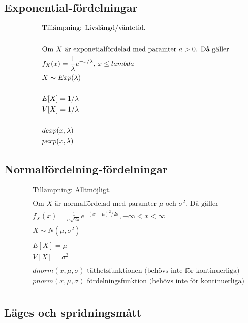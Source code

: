 \subsection{Exponential-fördelningar}
\begin{align*}
  &\quad  \text{Tillämpning: Livslängd/väntetid.} \\
  &\quad  \\
  &\quad  \text{Om $X$ är exponetialfördelad med paramter $ a > 0 $. Då gäller} \\
  &\quad  f_X(x) = \frac{1}{\lambda} e^{-x/\lambda}, \, x\leq{lambda} \\
  &\quad  X \sim Exp(\lambda) \\
  &\quad  \\
  &\quad  E[X]= 1/\lambda \\
  &\quad  V[X]= 1/\lambda \\
  &\quad  \\
  &\quad  dexp(x, \lambda) \\
  &\quad  pexp(x, \lambda) \\
\end{align*}

\subsection{Normalfördelning-fördelningar}
\begin{align*}
  &\quad  \text{Tillämpning: Alltmöjligt.} \\
  &\quad  \\
  &\quad  \text{Om $X$ är normalfördelad med paramter $\mu$ och $\sigma^2$. Då gäller} \\
  &\quad  f_X(x) = \frac{1}{\sigma\sqrt{2\pi}} e^{-(x-\mu)^2/2\sigma}, -\infty<x<\infty \\
  &\quad  X \sim N(\mu,\sigma^2) \\
  &\quad  \\
  &\quad  E[X]= \mu \\
  &\quad  V[X]= \sigma^2 \\
  &\quad  \\
  &\quad  dnorm(x, \mu, \sigma) \text{ täthetsfunktionen (behövs inte för kontinuerliga)} \\
  &\quad  pnorm(x, \mu, \sigma) \text{ fördelningsfunktion (behövs inte för kontinuerliga)} \\
\end{align*}


\subsection{Läges och spridningsmått}
